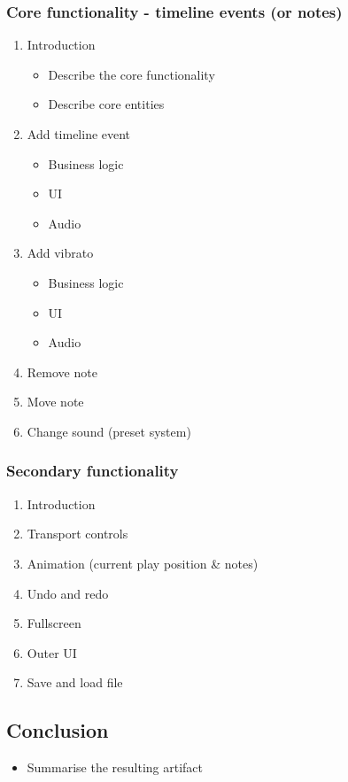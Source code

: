 \documentclass[a4paper,12pt]{article}
\begin{document}
\subsubsection{Core functionality - timeline events (or notes)}
\label{sec:orgf2c29ee}
\begin{enumerate}
\item Introduction
\begin{itemize}
\item Describe the core functionality
\item Describe core entities
\end{itemize}
\item Add timeline event
\begin{itemize}
\item Business logic
\item UI
\item Audio
\end{itemize}
\item Add vibrato
\begin{itemize}
\item Business logic
\item UI
\item Audio
\end{itemize}
\item Remove note
\item Move note
\item Change sound (preset system)
\end{enumerate}

\subsubsection{Secondary functionality}
\label{sec:org89e7f42}
\begin{enumerate}
\item Introduction
\item Transport controls
\item Animation (current play position \& notes)
\item Undo and redo
\item Fullscreen
\item Outer UI
\item Save and load file
\end{enumerate}

\subsection{Conclusion}
\label{sec:org01905a0}
\begin{itemize}
\item Summarise the resulting artifact
\end{itemize}
\end{document}
